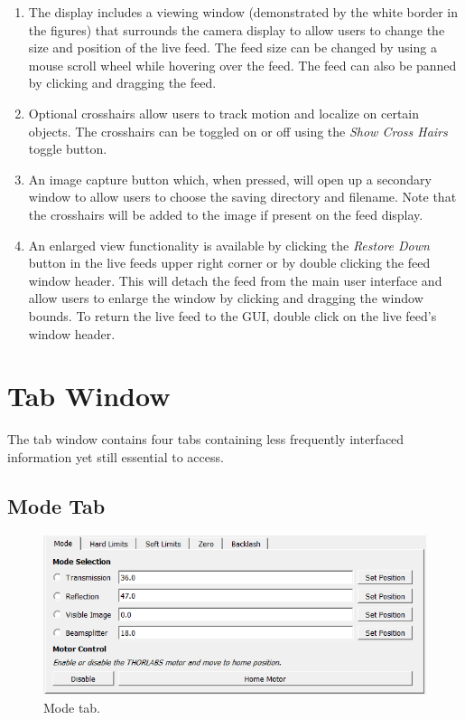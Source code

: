 \documentclass[a4paper, 12pt]{report}
\begin{document}
    \begin{enumerate}
        \item The display includes a viewing window (demonstrated by the white border in the figures) that surrounds the camera display to allow users to change the size and position of the live feed. The feed size can be changed by using a mouse scroll wheel while hovering over the feed. The feed can also be panned by clicking and dragging the feed.
        \item Optional crosshairs allow users to track motion and localize on certain objects. The crosshairs can be toggled on or off using the \textit{Show Cross Hairs} toggle button.
        \item An image capture button which, when pressed, will open up a secondary window to allow users to choose the saving directory and filename. Note that the crosshairs will be added to the image if present on the feed display.
        \item An enlarged view functionality is available by clicking the \textit{Restore Down} button in the live feeds upper right corner or by double clicking the feed window header. This will detach the feed from the main user interface and allow users to enlarge the window by clicking and dragging the window bounds. To return the live feed to the GUI, double click on the live feed's window header.
    \end{enumerate}
    
    
    \section{Tab Window}
    The tab window contains four tabs containing less frequently interfaced information yet still essential to access.
    
    \subsection{Mode Tab}
    \begin{figure}[h]
        \centering
        \includegraphics{figures/thorlabs_mode_tab.png}
        \caption{Mode tab.}
        \label{fig:5}
    \end{figure}
    
\end{document}
